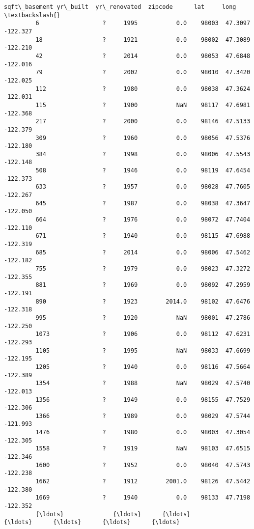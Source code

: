 \documentclass[11pt]{article}
\begin{document}
\begin{Verbatim}[commandchars=\\\{\}]
                sqft\_basement yr\_built  yr\_renovated  zipcode      lat     long  \textbackslash{}
         6                  ?     1995           0.0    98003  47.3097 -122.327   
         18                 ?     1921           0.0    98002  47.3089 -122.210   
         42                 ?     2014           0.0    98053  47.6848 -122.016   
         79                 ?     2002           0.0    98010  47.3420 -122.025   
         112                ?     1980           0.0    98038  47.3624 -122.031   
         115                ?     1900           NaN    98117  47.6981 -122.368   
         217                ?     2000           0.0    98146  47.5133 -122.379   
         309                ?     1960           0.0    98056  47.5376 -122.180   
         384                ?     1998           0.0    98006  47.5543 -122.148   
         508                ?     1946           0.0    98119  47.6454 -122.373   
         633                ?     1957           0.0    98028  47.7605 -122.267   
         645                ?     1987           0.0    98038  47.3647 -122.050   
         664                ?     1976           0.0    98072  47.7404 -122.110   
         671                ?     1940           0.0    98115  47.6988 -122.319   
         685                ?     2014           0.0    98006  47.5462 -122.182   
         755                ?     1979           0.0    98023  47.3272 -122.355   
         881                ?     1969           0.0    98092  47.2959 -122.191   
         890                ?     1923        2014.0    98102  47.6476 -122.318   
         995                ?     1920           NaN    98001  47.2786 -122.250   
         1073               ?     1906           0.0    98112  47.6231 -122.293   
         1105               ?     1995           NaN    98033  47.6699 -122.195   
         1205               ?     1940           0.0    98116  47.5664 -122.389   
         1354               ?     1988           NaN    98029  47.5740 -122.013   
         1356               ?     1949           0.0    98155  47.7529 -122.306   
         1366               ?     1989           0.0    98029  47.5744 -121.993   
         1476               ?     1980           0.0    98003  47.3054 -122.305   
         1558               ?     1919           NaN    98103  47.6515 -122.346   
         1600               ?     1952           0.0    98040  47.5743 -122.238   
         1662               ?     1912        2001.0    98126  47.5442 -122.380   
         1669               ?     1940           0.0    98133  47.7198 -122.352   
         {\ldots}              {\ldots}      {\ldots}           {\ldots}      {\ldots}      {\ldots}      {\ldots}   

\end{Verbatim}
\end{document}
